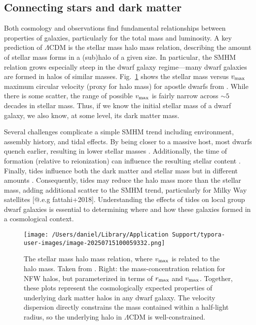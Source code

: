 \subsection{Connecting stars and dark
matter}\label{connecting-stars-and-dark-matter}

Both cosmology and observations find fundamental relationships between
properties of galaxies, particularly for the total mass and luminosity.
A key prediction of \(\Lambda\)CDM is the stellar mass halo mass
relation, describing the amount of stellar mass forms in a (sub)halo of
a given size. In particular, the SMHM relation grows especially steep in
the dwarf galaxy regime---many dwarf galaxies are formed in halos of
similar masses. Fig.~\ref{fig:smhm} shows the stellar mass versus
\(v_{\rm max}\) maximum circular velocity (proxy for halo mass) for
apostle dwarfs from \citet{fattahi+2018}. While there is some scatter,
the range of possible \(v_{\rm max}\) is fairly narrow across \(\sim 5\)
decades in stellar mass. Thus, if we know the initial stellar mass of a
dwarf galaxy, we also know, at some level, its dark matter mass.

Several challenges complicate a simple SMHM trend including environment,
assembly history, and tidal effects. By being closer to a massive host,
most dwarfs quench earlier, resulting in lower stellar masses
\citep[e.g.][]{christensen+2024}. Additionally, the time of formation
(relative to reionization) can influence the resulting stellar content
\citep{kim+2024}. Finally, tides influence both the dark matter and
stellar mass but in different amounts \citep[e.g.][]{PNM2008}.
Consequently, tides may reduce the halo mass more than the stellar mass,
adding additional scatter to the SMHM trend, particularly for Milky Way
satellites {[}@.e.g fattahi+2018{]}. Understanding the effects of tides
on local group dwarf galaxies is essential to determining where and how
these galaxies formed in a cosmological context.

\begin{figure}
\centering
\texttt{[image: /Users/daniel/Library/Application Support/typora-user-images/image-20250715100059332.png]}
\caption[Stellar-mass halo-mass relation]{The stellar mass halo mass
relation, where \(v_{\rm max}\) is related to the halo mass. Taken from
\citet{fattahi+2018}. Right: the mass-concentration relation for NFW
halos, but parameterized in terms of \(r_{\rm max}\) and
\(v_{\rm max}\). Together, these plots represent the cosmologically
expected properties of underlying dark matter halos in any dwarf galaxy.
The velocity dispersion directly constrains the mass contained within a
half-light radius, so the underlying halo in \(\Lambda\)CDM is
well-constrained.}\label{fig:smhm}
\end{figure}

